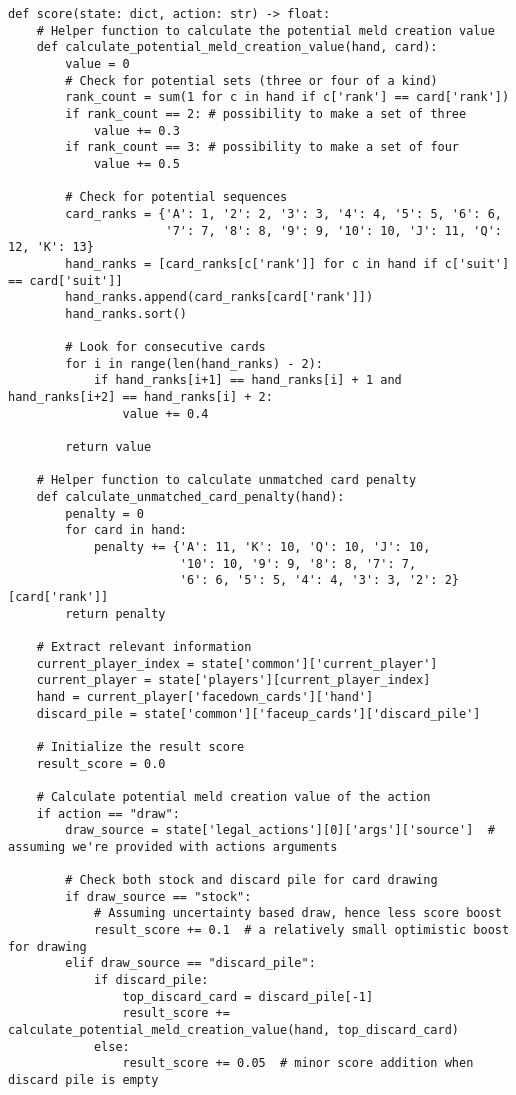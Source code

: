 \begin{tcolorbox}[
breakable,
title=Gameplay AI policy component in code,  
colframe=gray, 
colback=white,
]
\begin{lstlisting}[]
def score(state: dict, action: str) -> float:
    # Helper function to calculate the potential meld creation value
    def calculate_potential_meld_creation_value(hand, card):
        value = 0
        # Check for potential sets (three or four of a kind)
        rank_count = sum(1 for c in hand if c['rank'] == card['rank'])
        if rank_count == 2: # possibility to make a set of three
            value += 0.3
        if rank_count == 3: # possibility to make a set of four
            value += 0.5
                    
        # Check for potential sequences
        card_ranks = {'A': 1, '2': 2, '3': 3, '4': 4, '5': 5, '6': 6,
                      '7': 7, '8': 8, '9': 9, '10': 10, 'J': 11, 'Q': 12, 'K': 13}
        hand_ranks = [card_ranks[c['rank']] for c in hand if c['suit'] == card['suit']]
        hand_ranks.append(card_ranks[card['rank']])
        hand_ranks.sort()
        
        # Look for consecutive cards
        for i in range(len(hand_ranks) - 2):
            if hand_ranks[i+1] == hand_ranks[i] + 1 and hand_ranks[i+2] == hand_ranks[i] + 2:
                value += 0.4
                
        return value
        
    # Helper function to calculate unmatched card penalty
    def calculate_unmatched_card_penalty(hand):
        penalty = 0
        for card in hand:
            penalty += {'A': 11, 'K': 10, 'Q': 10, 'J': 10,
                        '10': 10, '9': 9, '8': 8, '7': 7,
                        '6': 6, '5': 5, '4': 4, '3': 3, '2': 2}[card['rank']]
        return penalty

    # Extract relevant information
    current_player_index = state['common']['current_player']
    current_player = state['players'][current_player_index]
    hand = current_player['facedown_cards']['hand']
    discard_pile = state['common']['faceup_cards']['discard_pile']

    # Initialize the result score
    result_score = 0.0

    # Calculate potential meld creation value of the action
    if action == "draw":
        draw_source = state['legal_actions'][0]['args']['source']  # assuming we're provided with actions arguments
        
        # Check both stock and discard pile for card drawing
        if draw_source == "stock":
            # Assuming uncertainty based draw, hence less score boost
            result_score += 0.1  # a relatively small optimistic boost for drawing
        elif draw_source == "discard_pile":
            if discard_pile:
                top_discard_card = discard_pile[-1]
                result_score += calculate_potential_meld_creation_value(hand, top_discard_card)
            else:
                result_score += 0.05  # minor score addition when discard pile is empty


\end{lstlisting}
\end{tcolorbox}
